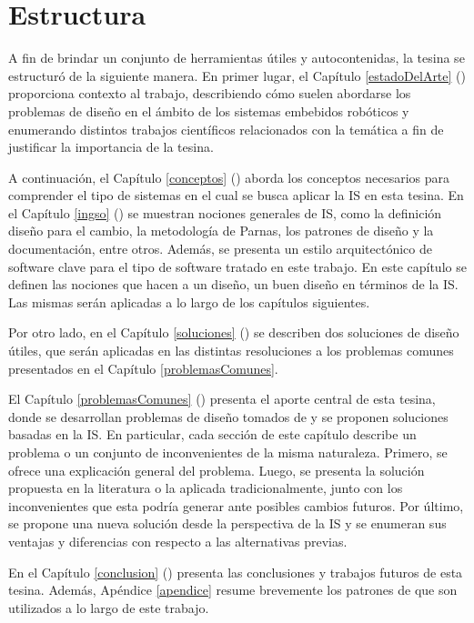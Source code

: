 \section*{Estructura}

A fin de brindar un conjunto de herramientas útiles y autocontenidas, la tesina se estructuró de la siguiente manera. En primer lugar, el Capítulo \ref{estadoDelArte} () proporciona contexto al trabajo, describiendo cómo suelen abordarse los problemas de diseño en el ámbito de los sistemas embebidos robóticos y enumerando distintos trabajos científicos relacionados con la temática a fin de justificar la importancia de la tesina.

A continuación, el Capítulo \ref{conceptos} () aborda los conceptos necesarios para comprender el tipo de sistemas en el cual se busca aplicar la \gls{IS} en esta tesina. En el Capítulo \ref{ingso} () se muestran nociones generales de \gls{IS}, como la definición diseño para el cambio, la metodología de Parnas, los patrones de diseño y la documentación, entre otros. Además, se presenta un estilo arquitectónico de software clave para el tipo de software tratado en este trabajo. En este capítulo se definen las nociones que hacen a un diseño, un buen diseño en términos de la \gls{IS}. Las mismas serán aplicadas a lo largo de los capítulos siguientes.

Por otro lado, en el Capítulo \ref{soluciones} () se describen dos soluciones de diseño útiles, que serán aplicadas en las distintas resoluciones a los problemas comunes presentados en el Capítulo \ref{problemasComunes}.

El Capítulo \ref{problemasComunes} () presenta el aporte central de esta tesina, donde se desarrollan problemas de diseño tomados de \cite{douglass} y se proponen soluciones basadas en la \gls{IS}. En particular, cada sección de este capítulo describe un problema o un conjunto de inconvenientes de la misma naturaleza. Primero, se ofrece una explicación general del problema. Luego, se presenta la solución propuesta en la literatura o la aplicada tradicionalmente, junto con los inconvenientes que esta podría generar ante posibles cambios futuros. Por último, se propone una nueva solución desde la perspectiva de la \gls{IS} y se enumeran sus ventajas y diferencias con respecto a las alternativas previas.

En el Capítulo \ref{conclusion} () presenta las conclusiones y trabajos futuros de esta tesina. Además, Apéndice \ref{apendice} resume brevemente los patrones de \cite{Gamma:1995:DPE:186897} que son utilizados a lo largo de este trabajo.


